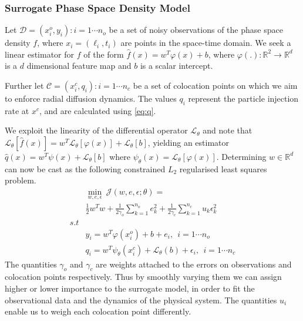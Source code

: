\subsubsection*{Surrogate Phase Space Density Model}

Let $\mathcal{D}={(x^{o}_{i}, y_{i}): i = 1 \cdots n_{o}}$ be a set of noisy observations of the 
phase space density $f$, where $x_{i} = (\ell_{i}, t_{i})$ are points in the space-time domain. We 
seek a linear estimator for $f$ of the form $\hat{f}(x) = w^{T}\varphi(x) + b$, where 
$\varphi(.): \mathbb{R}^{2} \rightarrow \mathbb{R}^{d}$ is a $d$ dimensional feature map and $b$ is 
a scalar intercept.

Further let $\mathcal{C} ={(x^{c}_{i}, q_{i}): i = 1 \cdots n_{c}}$ be a set of colocation points 
on which we aim to enforce radial diffusion dynamics. The values $q_{i}$ represent the particle 
injection rate at $x^c$, and are calculated using \cref{eq:q}.

We exploit the linearity of the differential operator $\mathcal{L}_{\theta}$ and note that 
$\mathcal{L}_{\theta} [\hat{f}(x)] = w^{T} \mathcal{L}_{\theta}[\varphi(x)] + \mathcal{L}_{\theta}[b]$, 
yielding an estimator 
$\hat{q}(x) = w^{T}\psi(x) + \mathcal{L}_{\theta}[b]$ where $\psi_{\theta}(x) = \mathcal{L}_{\theta}[\varphi(x)]$. 
Determining $w \in \mathbb{R}^d$ can now be cast as the following constrained $L_2$ regularised 
least squares problem.
%
\begin{equation}\label{eq:surrogate}
   \begin{aligned}
    & \min_{w,e,\epsilon} \ \mathcal{J}(w,e,\epsilon;\theta) = \\
    & \frac{1}{2} w^{T}w + \frac{1}{2\gamma_{o}} \sum_{k = 1}^{n_{o}}{e^{2}_{k}} + 
      \frac{1}{2\gamma_{c}} \sum_{k = 1}^{n_{c}}{u_{k} \epsilon^{2}_{k}} \\
    s.t & \\
    & y_{i}  = w^{T}\varphi(x^{o}_{i}) + b + e_{i}, \ \ i = 1 \cdots n_{o} \\
    & q_{i} = w^{T}\psi_{\theta}(x^{c}_{i}) + \mathcal{L}_{\theta}(b) + \epsilon_{i}, \ \ i = 1 \cdots n_{c}
   \end{aligned}
\end{equation}
%
The quantities $\gamma_{o}$ and $\gamma_{c}$ are weights attached to the errors on observations and 
colocation points respectively. Thus by smoothly varying them we can assign higher or lower 
importance to the surrogate model, in order to fit the observational data and the dynamics of the 
physical system. The quantities $u_i$ enable us to weigh each colocation point differently. 

